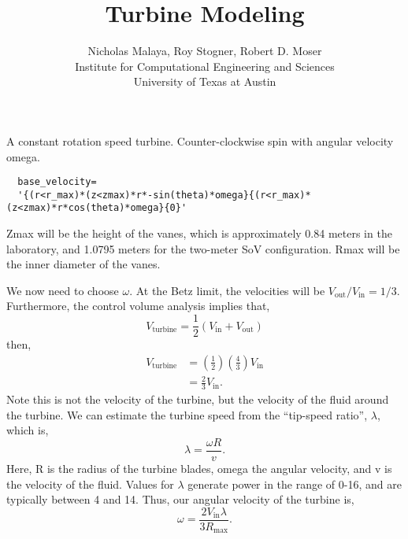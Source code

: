 \documentclass{article}
\title{\bf{Turbine Modeling}}
\author{Nicholas Malaya, Roy Stogner, Robert D. Moser \\ Institute for Computational Engineering and Sciences \\ University of Texas at Austin} \date{}
\begin{document}
\maketitle

\newpage

A constant rotation speed turbine. Counter-clockwise spin with angular velocity omega. 

\begin{verbatim}
  base_velocity=
  '{(r<r_max)*(z<zmax)*r*-sin(theta)*omega}{(r<r_max)*(z<zmax)*r*cos(theta)*omega}{0}'
\end{verbatim}

Zmax will be the height of the vanes, which is approximately 0.84 meters in the laboratory, 
and 1.0795 meters for the two-meter SoV configuration. Rmax will be the inner diameter of the vanes. 

We now need to choose $\omega$. At the Betz limit, the velocities will be
$V_{\text{out}}/V_{\text{in}} = 1/3$. Furthermore, the control volume
analysis implies that,
\begin{equation}
 V_{\text{turbine}} = \frac{1}{2}\left(V_{\text{in}} + V_{\text{out}} \right)
\end{equation}
then,
\begin{align}
 V_{\text{turbine}} &= \left(\frac{1}{2}\right) \left(\frac{4}{3}\right) V_{\text{in}} \\
 &= \frac{2}{3} V_{\text{in}}.
\end{align}
Note this is not the velocity of the turbine, but the velocity of the
fluid around the turbine. We can estimate the turbine speed from the
``tip-speed ratio'', $\lambda$, which is,
\begin{equation}
 \lambda = \frac{\omega R}{v}.
\end{equation}
Here, R is the radius of the turbine blades, omega the angular velocity,
and v is the velocity of the fluid. Values for $\lambda$ generate power
in the range of 0-16, and are typically between 4 and 14. Thus, our
angular velocity of the turbine is, 
\begin{equation}
 \omega = \frac{ 2 V_{\text{in}}\lambda}{3 R_{\text{max}}}.
\end{equation}
\end{document}
